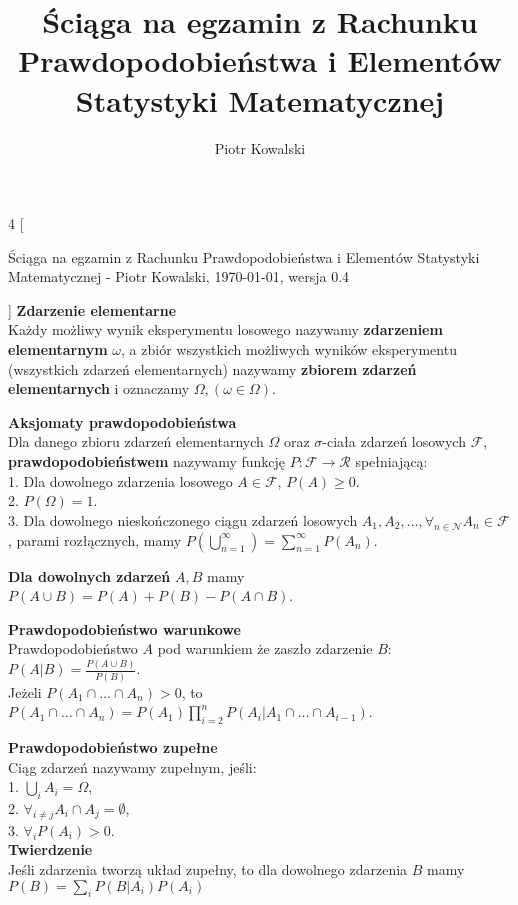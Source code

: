 \documentclass[10pt,landscape,a4paper,notitlepage]{article}
\author{Piotr Kowalski}
\title{Ściąga na egzamin z Rachunku Prawdopodobieństwa i Elementów Statystyki Matematycznej}
\begin{document}
    \begin{multicols*}{4}
        [
        \begin{center}
            Ściąga na egzamin z Rachunku Prawdopodobieństwa i Elementów Statystyki Matematycznej - Piotr Kowalski, \today , wersja 0.4
        \end{center}
        ]
        \noindent\textbf{\large Zdarzenie elementarne}\\
        Każdy możliwy wynik eksperymentu losowego nazywamy \textbf{zdarzeniem elementarnym} $\omega$, a zbiór wszystkich możliwych wyników eksperymentu (wszystkich zdarzeń elementarnych) nazywamy \textbf{zbiorem zdarzeń elementarnych} i oznaczamy $\Omega, (\omega\in\Omega)$.
        
        \noindent\textbf{\large Aksjomaty prawdopodobieństwa}\\
        Dla danego zbioru zdarzeń elementarnych $\Omega$ oraz $\sigma$-ciała zdarzeń losowych $\mathcal{F}$, \textbf{prawdopodobieństwem} nazywamy funkcję $P:\mathcal{F}\rightarrow \mathcal{R}$ spełniającą:\\
        1. Dla dowolnego zdarzenia losowego $A\in\mathcal{F}$, $P(A)\geq 0$.\\
        2. $P(\Omega)=1$.\\
        3. Dla dowolnego nieskończonego ciągu zdarzeń losowych $A_1, A_2, \ldots, \forall_{n\in\mathcal{N}} A_n\in\mathcal{F}$, parami rozłącznych, mamy $P\left(\bigcup^\infty_{n=1}\right)=\sum^\infty_{n=1}P(A_n)$.

        \noindent \textbf{Dla dowolnych zdarzeń} $A, B$ mamy\\ $P(A\cup B)=P(A)+P(B)-P(A\cap B)$.

        \noindent \textbf{\large Prawdopodobieństwo warunkowe}\\
        Prawdopodobieństwo $A$ pod warunkiem że zaszło zdarzenie $B$: $P(A|B)=\frac{P(A\cup B)}{P(B)}$.\\
        Jeżeli $P(A_1\cap \ldots \cap A_n)>0$, to $P(A_1\cap \ldots \cap A_n) = P(A_1)\prod_{i=2}^nP(A_i|A_1 \cap\ldots\cap A_{i-1})$.

        \noindent \textbf{\large Prawdopodobieństwo zupełne}\\
        Ciąg zdarzeń nazywamy zupełnym, jeśli:\\
        1. $\bigcup_i A_i = \Omega$,\\
        2. $\forall_{i\neq j}A_i \cap A_j = \emptyset$,\\
        3. $\forall_i P(A_i)>0$.\\
        \textbf{Twierdzenie}\\
        Jeśli zdarzenia tworzą układ zupełny, to dla dowolnego zdarzenia $B$ mamy $P(B)=\sum_iP(B|A_i)P(A_i)$


\end{multicols*}
\end{document}
